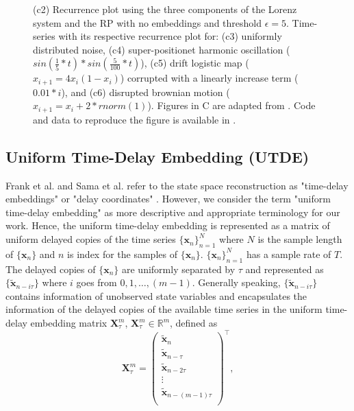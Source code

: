 \documentclass[fleqn,10pt]{wlscirep}
\begin{document}
\begin{figure}[ht]
{	(c2) Recurrence plot using the three components of the Lorenz system and the RP with no embeddings and threshold $\epsilon=5$.
	Time-series with its respective recurrence plot for:
	(c3) uniformly distributed noise,
	(c4) super-positionet harmonic oscillation ($sin( \frac{1}{5}*t) * sin( \frac{5}{100}*t) $),
	(c5) drift logistic map ($x_{i+1} = 4 x_i (1- x_i) $) corrupted with a linearly increase term ($0.01*i$), and
	(c6) disrupted brownian motion  ($x_{i+1} = x_i + 2*rnorm(1) $).
	Figures in C are adapted from \cite{marwan2015}.
	Code and data to reproduce the figure is available in \cite{srep2021}.
    }
    \label{fig01}
\end{figure}

\subsection*{Uniform Time-Delay Embedding (UTDE)}\label{sec:utimedelayembedding}
Frank et al. and Sama et al. refer to the state space reconstruction as "time-delay embeddings" or "delay coordinates" \cite{frank2010, sama2013}.
However, we consider the term "uniform time-delay embedding" as more descriptive and appropriate terminology for our work.
Hence, the uniform time-delay embedding is represented as a matrix of uniform delayed copies of the time series $\{ \boldsymbol{x}_n \}_{n=1}^N$ where $N$ is the sample length of $\{ \boldsymbol{x}_n \}$ and $n$ is index for the samples of $\{ \boldsymbol{x}_n \}$.
$\{ \boldsymbol{x}_n \}_{n=1}^N$ has a sample rate of $T$.
The delayed copies of $\{ \boldsymbol{x}_n \}$ are uniformly separated by $\tau$ and represented as $\{\boldsymbol{ \tilde{x} }_{n- i\tau} \}$ where $i$ goes from $0,1, \dots, (m-1)$.
Generally speaking, $\{\boldsymbol{ \tilde{x} }_{n- i\tau} \}$ contains information of unobserved state variables and encapsulates the information of the delayed copies of the available time series in the uniform time-delay embedding matrix $\boldsymbol{X}^{m}_{\tau}$, $\boldsymbol{X}^{m}_{\tau} \in \mathbb{R}^m$, defined as
\begin{equation}\label{eq:tde}
\boldsymbol{X}^{m}_{\tau}  =
\begin{pmatrix}
\boldsymbol{ \tilde{x} }_n \\
\boldsymbol{ \tilde{x} }_{n-\tau} \\
\boldsymbol{ \tilde{x} }_{n-2\tau} \\
\vdots \\
\boldsymbol{ \tilde{x} }_{n- (m-1) \tau} \\
\end{pmatrix}^\intercal, 
\end{equation}
\end{document}
